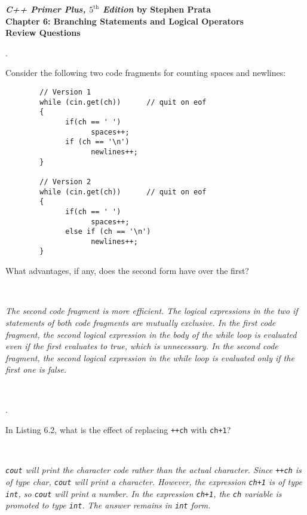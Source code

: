 \documentclass{amsart}
\begin{document}
\begin{center}
	\Large {\bfseries
	\emph{C++ Primer Plus, $5^{\text{th}}$ Edition} by Stephen Prata \\
	Chapter 6: Branching Statements and Logical Operators \\
	Review Questions} \normalsize \vspace{.5 cm}
\end{center}



\vfill
{}. 
\begin{minipage}[t]{11.5 cm}
	Consider the following two code fragments for counting spaces and newlines:
	\begin{verbatim}
		// Version 1
		while (cin.get(ch))      // quit on eof
		{
		      if(ch == ' ')
		            spaces++;
		      if (ch == '\n')
		            newlines++;
		}

		// Version 2
		while (cin.get(ch))      // quit on eof
		{
		      if(ch == ' ')
		            spaces++;
		      else if (ch == '\n')
		            newlines++;
		}
	\end{verbatim}
	What advantages, if any, does the second form have over the first?
\end{minipage} \\[1ex]
\phantom{3. } 
\begin{minipage}[t]{11.5 cm}
	{\slshape The second code fragment is more efficient. The logical expressions in the two if statements of both code fragments are mutually exclusive. In the first code fragment, the second logical expression in the body of the while loop is evaluated even if the first evaluates to true, which is unnecessary. In the second code fragment, the second logical expression in the while loop is evaluated only if the first one is false. } 
\end{minipage} 
\\[.2cm]
\vfill

. 
\begin{minipage}[t]{11.5 cm}
	In Listing 6.2, what is the effect of replacing \texttt{++ch} with \texttt{ch+1}?
\end{minipage} \\[1ex]
\phantom{2. } 
\begin{minipage}[t]{11.5 cm}
	{\slshape \verb+cout+ will print the character code rather than the actual character. Since \verb?++ch? is of type char, \verb+cout+ will print a character. However, the expression \verb?ch+1? is of type \verb+int+, so \verb+cout+ will print a number. In the expression \verb?ch+1?, the \verb?ch? variable is promoted to type \verb+int+. The answer remains in \verb+int+ form.} 
\end{minipage} 
\vfill
\newpage
\end{document}
